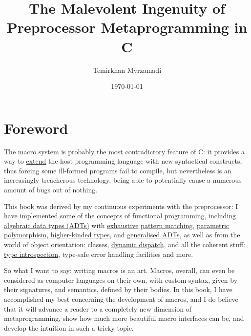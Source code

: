 \documentclass[a4paper, 12pt]{book}
\begin{document}
\title{The Malevolent Ingenuity of Preprocessor Metaprogramming in C}
\author{Temirkhan Myrzamadi}
\date{\today}
\maketitle

\tableofcontents

\newpage

\section{Foreword}

The macro system is probably the most contradictory feature of C: it provides a way to
\href{https://en.wikipedia.org/wiki/Extensible_programming}{extend} the host programming
language with new syntactical constructs, thus forcing some ill-formed programs fail
to compile, but nevertheless is an increasingly treacherous technology, being able to
potentially cause a numerous amount of bugs out of nothing.

This book was derived by my continuous experiments with the preprocessor: I have implemented
some of the concepts of functional programming, including
\href{https://en.wikipedia.org/wiki/Algebraic_data_type}{algebraic data types (ADTs)} with
\href{https://en.wikipedia.org/wiki/Proof_by_exhaustion}{exhaustive}
\href{https://en.wikipedia.org/wiki/Pattern_matching}{pattern matching},
\href{https://en.wikipedia.org/wiki/Parametric_polymorphism}{parametric polymorphism},
\href{https://en.wikipedia.org/wiki/Kind_(type_theory)}{higher-kinded types}, and
\href{https://en.wikipedia.org/wiki/Generalized_algebraic_data_type}{generalised ADTs}, as
well as from the world of object orientation: classes,
\href{https://en.wikipedia.org/wiki/Dynamic_dispatch}{dynamic dispatch}, and all the coherent
stuff: \href{https://en.wikipedia.org/wiki/Type_introspection}{type introspection}, type-safe
error handling facilities and more.

So what I want to say: writing macros is an art. Macros, overall, can even be considered as
computer languages on their own, with custom syntax, given by their signatures, and
semantics, defined by their bodies. In this book, I have accomplished my best concerning
the development of macros, and I do believe that it will advance a reader to a completely
new dimension of metaprogramming, show how much more beautiful macro interfaces can be, and
develop the intuition in such a tricky topic.
\end{document}
